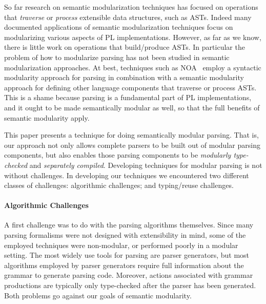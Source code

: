 So far research on semantic modularization techniques has focused on
operations that \emph{traverse} or \emph{process} extensible
data structures, such as ASTs. Indeed many documented applications of
semantic modularization techniques focus on modularizing various
aspects of PL implementations.  However, as far as we know, there is
little work on operations that build/produce ASTs.  In particular the
problem of how to modularize parsing has not been studied in semantic
modularization approaches. At best, techniques such as NOA~\cite{Gouseti2014}
employ a syntactic modularity approach for parsing in combination with
a semantic modularity approach for defining other language components
that traverse or process ASTs. This is a shame because parsing is a
fundamental part of PL implementations, and it ought to be made
semantically modular as well, so that the full benefits of semantic
modularity apply.


This paper presents a technique for doing semantically
modular parsing.  That is, our approach not only allows complete
parsers to be built out of modular parsing components, but also enables
those parsing components to be \emph{modularly type-checked} and
\emph{separately compiled}. Developing techniques for modular parsing
is not without challenges. In developing our techniques we encountered
two different classes of challenges: algorithmic challenges; and
typing/reuse challenges.

\paragraph{Algorithmic Challenges} A first challenge was to do with
  the parsing algorithms themselves. Since many parsing formalisms
  were not designed with extensibility in mind, some of the employed
  techniques were non-modular, or performed poorly in a modular
  setting.  The most widely use tools for parsing are parser
  generators, but most algorithms employed by parser generators
  require full information about the grammar to generate parsing
  code. Moreover, actions associated with grammar productions are
  typically only type-checked after the parser has been
  generated. Both problems go against our goals of semantic
  modularity.


